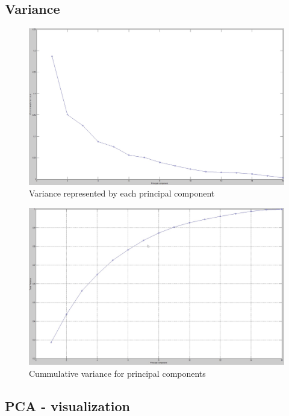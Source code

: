 \subsection*{Variance}

\begin{figure}[!tbh]
	\centering
	\includegraphics[width=1\textwidth]{figures/variance_perpc}
	\caption{Variance represented by each principal component}
	\label{fig:variance_perpc}
\end{figure}

\begin{figure}[!tbh]
	\centering
	\includegraphics[width=1\textwidth]{figures/variance_cummulated}
	\caption{Cummulative variance for principal components}
	\label{fig:boxplot_cummulated}
\end{figure}

\subsection*{PCA - visualization}

